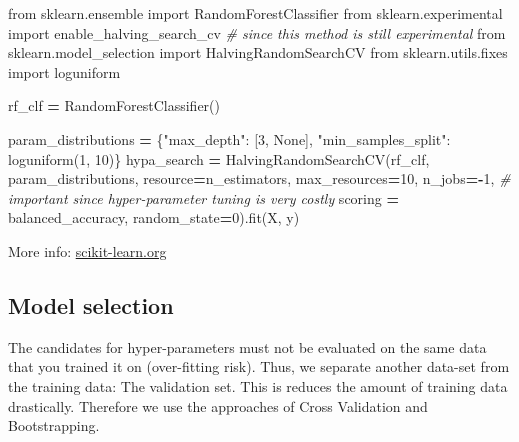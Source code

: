 \documentclass[
]{book}
\newenvironment{Shaded}{\begin{snugshade}}{\end{snugshade}}
\newcommand{\CommentTok}[1]{\textcolor[rgb]{0.56,0.35,0.01}{\textit{#1}}}
\newcommand{\DecValTok}[1]{\textcolor[rgb]{0.00,0.00,0.81}{#1}}
\newcommand{\ImportTok}[1]{#1}
\newcommand{\NormalTok}[1]{#1}
\newcommand{\OperatorTok}[1]{\textcolor[rgb]{0.81,0.36,0.00}{\textbf{#1}}}
\newcommand{\StringTok}[1]{\textcolor[rgb]{0.31,0.60,0.02}{#1}}
\newcommand{\VariableTok}[1]{\textcolor[rgb]{0.00,0.00,0.00}{#1}}
\begin{document}
\begin{Shaded}
\begin{Highlighting}[]
\ImportTok{from}\NormalTok{ sklearn.ensemble }\ImportTok{import}\NormalTok{ RandomForestClassifier}
\ImportTok{from}\NormalTok{ sklearn.experimental }\ImportTok{import}\NormalTok{ enable\_halving\_search\_cv  }\CommentTok{\# since this method is still experimental}
\ImportTok{from}\NormalTok{ sklearn.model\_selection }\ImportTok{import}\NormalTok{ HalvingRandomSearchCV}
\ImportTok{from}\NormalTok{ sklearn.utils.fixes }\ImportTok{import}\NormalTok{ loguniform}

\NormalTok{rf\_clf }\OperatorTok{=}\NormalTok{ RandomForestClassifier()}

\NormalTok{param\_distributions }\OperatorTok{=}\NormalTok{ \{}\StringTok{"max\_depth"}\NormalTok{: [}\DecValTok{3}\NormalTok{, }\VariableTok{None}\NormalTok{],}
                       \StringTok{"min\_samples\_split"}\NormalTok{: loguniform(}\DecValTok{1}\NormalTok{, }\DecValTok{10}\NormalTok{)\}}
\NormalTok{hypa\_search }\OperatorTok{=}\NormalTok{ HalvingRandomSearchCV(rf\_clf, param\_distributions,}
\NormalTok{                               resource}\OperatorTok{=}\StringTok{\textquotesingle{}n\_estimators\textquotesingle{}}\NormalTok{,}
\NormalTok{                               max\_resources}\OperatorTok{=}\DecValTok{10}\NormalTok{,}
\NormalTok{                               n\_jobs}\OperatorTok{={-}}\DecValTok{1}\NormalTok{, }\CommentTok{\# important since hyper{-}parameter tuning is very costly}
\NormalTok{                               scoring }\OperatorTok{=} \StringTok{\textquotesingle{}balanced\_accuracy\textquotesingle{}}\NormalTok{,}
\NormalTok{                               random\_state}\OperatorTok{=}\DecValTok{0}\NormalTok{).fit(X, y)}
\end{Highlighting}
\end{Shaded}

More info:
\href{https://scikit-learn.org/stable/modules/grid_search.html\#searching-for-optimal-parameters-with-successive-halving}{scikit-learn.org}\\

\hypertarget{model-selection}{%
\subsection{Model selection}\label{model-selection}}

The candidates for hyper-parameters must not be evaluated on the same
data that you trained it on (over-fitting risk). Thus, we separate
another data-set from the training data: The validation set. This is
reduces the amount of training data drastically. Therefore we use the
approaches of Cross Validation and Bootstrapping.
\end{document}
